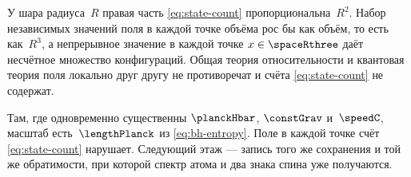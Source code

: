 У шара радиуса~$R$ правая часть \eqref{eq:state-count} пропорциональна~$R^2$.
Набор независимых значений поля в каждой точке объёма рос бы как объём, то есть как~$R^3$,
а непрерывное значение в каждой точке $x\in\spaceRthree$ даёт несчётное множество конфигураций.
Общая теория относительности и квантовая теория поля локально друг другу не противоречат
и счёта \eqref{eq:state-count} не содержат.

Там, где одновременно существенны $\planckHbar$, $\constGrav$ и~$\speedC$, масштаб есть~$\lengthPlanck$ из \eqref{eq:bh-entropy}.
Поле в каждой точке счёт \eqref{eq:state-count} нарушает.
Следующий этаж --- запись того же сохранения и той же обратимости,
при которой спектр атома и два знака спина уже получаются.

